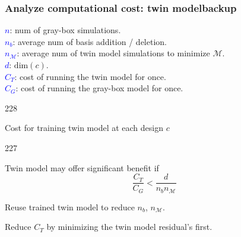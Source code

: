 \documentclass{beamer}
\newcommand{\barrow}{\item[\color{darkred}\ding{228}]}
\newcommand{\carrow}{\item[\color{darkred}\ding{227}]}
\begin{document}
\begin{frame}
    \frametitle{Analyze computational cost: twin model\hfill \scriptsize{backup}}\small
        \textcolor{blue}{$n$}: num of gray-box simulations.\\
        \textcolor{blue}{$n_b$}: average num of basis addition / deletion.\\
        \textcolor{blue}{$n_\mathcal{M}$}: average num of twin model simulations to minimize 
                         $\mathcal{M}$.\\
        \textcolor{blue}{$d$}: $\textrm{dim}(c)$.\\
        \textcolor{blue}{$C_T$}: cost of running the twin model for once.\\
        \textcolor{blue}{$C_G$}: cost of running the gray-box model for once.
    \vspace{.2cm}
    \begin{dinglist}{228}
        \barrow Cost for training twin model at each design $c$
            \begin{dinglist}{227}
            \carrow Twin model may offer significant benefit if
                    $$
                        \frac{C_T}{C_G} < \frac{d}{n_b n_\mathcal{M}}
                    $$
            \carrow Reuse trained twin model to reduce $n_b$, $n_\mathcal{M}$.
            \carrow Reduce $C_T$ by minimizing the twin model residual's first.
            \end{dinglist}
    \end{dinglist}
\end{frame}
\end{document}
